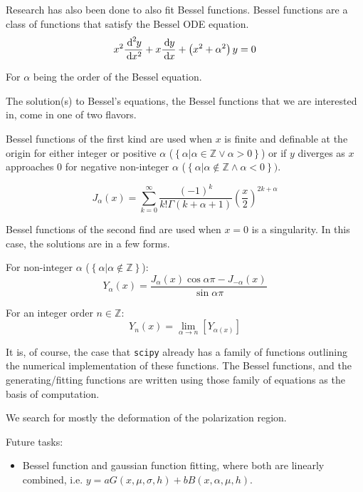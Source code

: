 \documentclass[twocolumn]{article}
\begin{document}
Research has also been done to also fit Bessel functions. Bessel functions are a class of functions that satisfy the Bessel ODE equation.
\begin{equation}
	x^2 \frac{\diff[2]{y}}{\diff{x^2}} + x \frac{\diff{y}}{\diff{x}} + \left( x^2 + \alpha^2 \right) y = 0
	\label{eq:Bessel_ODE_equation}
\end{equation}

For $\alpha$ being the order of the Bessel equation. 

The solution(s) to Bessel's equations, the Bessel functions that we are interested in, come in one of two flavors. 

Bessel functions of the first kind are used when $x$ is finite and definable at the origin for either integer or positive $\alpha$ ($\left\{ \left. \alpha \right| \alpha \in \mathbb{Z} \lor \alpha > 0 \right\}$) or if $y$ diverges as $x$ approaches $0$ for negative non-integer $\alpha$ ($\left\{ \left. \alpha \right| \alpha \notin \mathbb{Z} \land \alpha < 0\right\})$.

\begin{equation}
	J_{\alpha}(x) = \sum_{k=0}^{\infty} \frac{\left(-1\right)^{k}}{k! \Gamma(k+\alpha+1)} \left( \frac{x}{2} \right)^{2k + \alpha}
	\label{eq:Bessel_equation_firstkind}
\end{equation}

Bessel functions of the second find are used when $x=0$ is a singularity. In this case, the solutions are in a few forms.

For non-integer $\alpha$ ($\left\{ \left. \alpha \right| \alpha \notin \mathbb{Z} \right\}$):
\begin{equation}
	Y_{\alpha}(x) = \frac{J_{\alpha}(x) \cos{\alpha \pi} - J_{-\alpha}(x)}{\sin{\alpha\pi}}
	\label{eq:Bessel_equation_secondkind_noninterger}
\end{equation}

For an integer order $n \in \mathbb{Z}$:
\begin{equation}
	Y_{n}(x) = \lim_{\alpha \rightarrow n} \left[ {Y_{\alpha(x)}} \right]
	\label{eq:Bessel_equation_secondkind_interger}
\end{equation}

It is, of course, the case that \texttt{scipy} already has a family of functions outlining the numerical implementation of these functions. The Bessel functions, and the generating/fitting functions are written using those family of equations as the basis of computation. 


\begin{meetingnotes*}
	We search for mostly the deformation of the polarization region. 

	Future tasks:
	\begin{itemize}
		\item Bessel function and gaussian function fitting, where both are linearly combined, i.e. $y = a G(x,\mu,\sigma,h) + b B(x,\alpha,\mu,h)$.
	\end{itemize}
\end{meetingnotes*}
\end{document}

